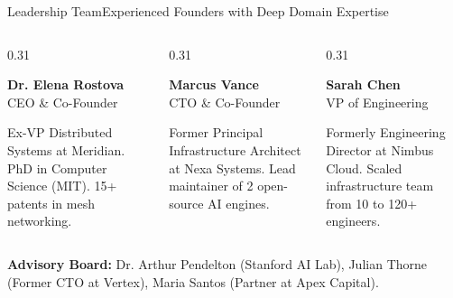 \documentclass[aspectratio=169,10pt]{beamer}
\begin{document}
\begin{frame}{Leadership Team}{Experienced Founders with Deep Domain Expertise}
  \begin{columns}[T]
    \begin{column}{0.31\textwidth}
      \begin{tcolorbox}[darkcard, halign=center]
        {\small \bfseries \color{textlight} Dr. Elena Rostova} \\
        {\tiny \color{neoncyan} CEO \& Co-Founder}
        \par\vspace*{0.15cm}
        \tiny Ex-VP Distributed Systems at Meridian. PhD in Computer Science (MIT). 15+ patents in mesh networking.
      \end{tcolorbox}
    \end{column}
    
    \begin{column}{0.31\textwidth}
      \begin{tcolorbox}[darkcard, halign=center]
        {\small \bfseries \color{textlight} Marcus Vance} \\
        {\tiny \color{neonpurple} CTO \& Co-Founder}
        \par\vspace*{0.15cm}
        \tiny Former Principal Infrastructure Architect at Nexa Systems. Lead maintainer of 2 open-source AI engines.
      \end{tcolorbox}
    \end{column}
    
    \begin{column}{0.31\textwidth}
      \begin{tcolorbox}[darkcard, halign=center]
        {\small \bfseries \color{textlight} Sarah Chen} \\
        {\tiny \color{emeralds} VP of Engineering}
        \par\vspace*{0.15cm}
        \tiny Formerly Engineering Director at Nimbus Cloud. Scaled infrastructure team from 10 to 120+ engineers.
      \end{tcolorbox}
    \end{column}
  \end{columns}

  \vspace*{0.3cm}
  \begin{tcolorbox}[purplecard]
    \centering \tiny \textbf{Advisory Board:} Dr. Arthur Pendelton (Stanford AI Lab), Julian Thorne (Former CTO at Vertex), Maria Santos (Partner at Apex Capital).
  \end{tcolorbox}
\end{frame}
\end{document}
